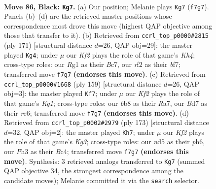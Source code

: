 \documentclass[11pt]{article}
\begin{document}
\clearpage

\begin{figure}[p]\centering
\begin{subfigure}{0.46\textwidth}\centering
\resizebox{\linewidth}{!}{%
\newchessgame
\chessboard[
  setfen={1B6/3b1k2/8/1P1N4/P3B3/3K3p/5R2/6r1 b - - 12 86},
  showmover=false,
  pgfstyle=straightmove, color=movearrow, markmove={f7-g7}
]}
\caption{}
\end{subfigure}\hfill
\begin{subfigure}{0.46\textwidth}\centering
\resizebox{\linewidth}{!}{%
\newchessgame
\chessboard[
  setfen={8/2bP1B2/2b5/7k/4p2P/1P6/4KB2/8 b - - 14 86},
  showmover=false,
  pgfstyle=straightmove, color=movearrow, markmove={h5-g4}
]}
\caption{}
\end{subfigure}
\\[4pt]
\begin{subfigure}{0.46\textwidth}\centering
\resizebox{\linewidth}{!}{%
\newchessgame
\chessboard[
  setfen={6k1/r7/2R4p/6bP/p5P1/B7/1K6/8 b - - 8 80},
  showmover=false,
  pgfstyle=straightmove, color=movearrow, markmove={g8-f7}
]}
\caption{}
\end{subfigure}\hfill
\begin{subfigure}{0.46\textwidth}\centering
\resizebox{\linewidth}{!}{%
\newchessgame
\chessboard[
  setfen={8/3r4/6kP/8/2b3p1/4B1P1/1R6/2K5 b - - 32 87},
  showmover=false,
  pgfstyle=straightmove, color=movearrow, markmove={g6-h7}
]}
\caption{}
\end{subfigure}
\caption{\textbf{Move 86, Black: \texttt{Kg7}.} (a) Our position; Melanie plays \texttt{Kg7} (\texttt{f7g7}). Panels (b)--(d) are the retrieved master positions whose correspondence most drove this move (highest QAP objective among those that transfer to it). (b) Retrieved from \texttt{ccrl\_top\_p0000\#2815} (ply 171) [structural distance $d$=26, QAP obj=29]: the master played \texttt{Kg4}; under $\mu$ our \emph{Kf2} plays the role of that game's \emph{Kh4}; cross-type roles: our \emph{R}g1 as their \emph{B}c7, our \emph{r}f2 as their \emph{b}f7; transferred move \texttt{f7g7} \textbf{(endorses this move)}. (c) Retrieved from \texttt{ccrl\_top\_p0000\#1668} (ply 159) [structural distance $d$=26, QAP obj=3]: the master played \texttt{Kf7}; under $\mu$ our \emph{Kf2} plays the role of that game's \emph{Kg1}; cross-type roles: our \emph{b}b8 as their \emph{R}a7, our \emph{B}d7 as their \emph{r}c6; transferred move \texttt{f7g7} \textbf{(endorses this move)}. (d) Retrieved from \texttt{ccrl\_top\_p0002\#2979} (ply 173) [structural distance $d$=32, QAP obj=2]: the master played \texttt{Kh7}; under $\mu$ our \emph{Kf2} plays the role of that game's \emph{Kg3}; cross-type roles: our \emph{n}d5 as their \emph{p}h6, our \emph{P}h3 as their \emph{B}c4; transferred move \texttt{f7g7} \textbf{(endorses this move)}. Synthesis: 3 retrieved analogs transferred to \texttt{Kg7} (summed QAP objective 34, the strongest correspondence among the candidate moves); Melanie committed it via the \texttt{search} selector.}
\label{fig:thought-m171}
\end{figure}
\end{document}

